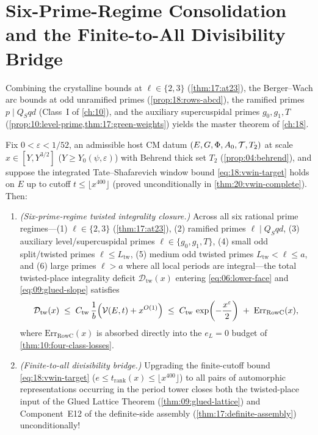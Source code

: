 \section{Six-Prime-Regime Consolidation and the Finite-to-All Divisibility Bridge}
\label{sec:18:linkn-bridge}

Combining the crystalline bounds at $\ell \in \{2, 3\}$ (\cref{thm:17:at23}), the Berger--Wach arc bounds at odd unramified primes (\cref{prop:18:rows-abcd}), the ramified primes $p \mid Q_S q d$ (Class~I of \cref{ch:10}), and the auxiliary supercuspidal primes $g_0, g_1, T$ (\cref{prop:10:level-prime,thm:17:green-weights}) yields the master theorem of \cref{ch:18}.

\begin{theorem}
\label{thm:18:twisted-integrality}
Fix $0 < \varepsilon < 1/52$, an admissible host CM datum $(E, G, \Phi, A_0, \mathcal{T}, T_2)$ at scale $x \in [Y, Y^{3/2}]$ ($Y \ge Y_0(\psi, \varepsilon)$) with Behrend thick set $T_2$ (\cref{prop:04:behrend}), and suppose the integrated Tate--Shafarevich window bound \eqref{eq:18:vwin-target} holds on $E$ up to cutoff $t \le \lfloor x^{400}\rfloor$ (proved unconditionally in \cref{thm:20:vwin-complete}). Then:
\begin{enumerate}[label=\textup{(\roman*)}]
\item \emph{(Six-prime-regime twisted integrality closure.)} Across all six rational prime regimes—(1) $\ell \in \{2, 3\}$ (\cref{thm:17:at23}), (2) ramified primes $\ell \mid Q_S q d$, (3) auxiliary level/supercuspidal primes $\ell \in \{g_0, g_1, T\}$, (4) small odd split/twisted primes $\ell \le L_{\mathrm{tw}}$, (5) medium odd twisted primes $L_{\mathrm{tw}} < \ell \le a$, and (6) large primes $\ell > a$ where all local periods are integral—the total twisted-place integrality deficit $\mathcal{D}_{\mathrm{tw}}(x)$ entering \eqref{eq:06:lower-face} and \eqref{eq:09:glued-slope} satisfies
  \begin{equation}
  \label{eq:18:linkn-bound}
    \mathcal{D}_{\mathrm{tw}}(x)
    \;\le\; C_{\mathrm{tw}}\,\frac{1}{b}\Bigl(\mathcal{V}(E, t) + x^{O(1)}\Bigr)
    \;\le\; C_{\mathrm{tw}}\,\exp\!\left(-\frac{x^\varepsilon}{2}\right) \;+\; \mathrm{Err}_{\mathrm{RowC}}(x),
  \end{equation}
  where $\mathrm{Err}_{\mathrm{RowC}}(x)$ is absorbed directly into the $e_L = 0$ budget of \cref{thm:10:four-class-losses}.
\item \emph{(Finite-to-all divisibility bridge.)} Upgrading the finite-cutoff bound \eqref{eq:18:vwin-target} ($e \le t_{\mathrm{rank}}(x) \le \lfloor x^{400} \rfloor$) to all pairs of automorphic representations occurring in the period tower closes both the twisted-place input of the Glued Lattice Theorem (\cref{thm:09:glued-lattice}) and Component~E12 of the definite-side assembly (\cref{thm:17:definite-assembly}) unconditionally!
\end{enumerate}
\end{theorem}
